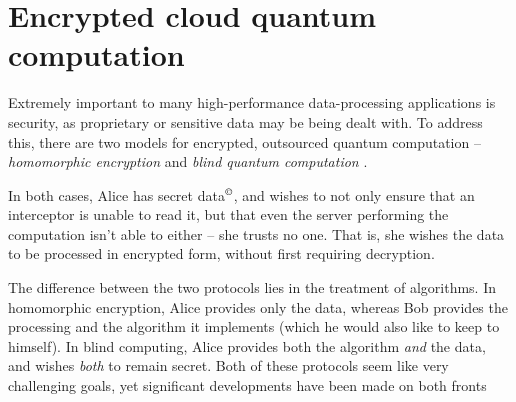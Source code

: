 %
%

\section{Encrypted cloud quantum computation} \label{sec:homo_blind} 


Extremely important to many high-performance data-processing applications is security, as proprietary or sensitive data may be being dealt with. To address this, there are two models for encrypted, outsourced quantum computation -- \textit{homomorphic encryption} \cite{???, gentry2009fully, van2010fully} and \textit{blind quantum computation} \cite{???, bib:blind2, bib:blind3, bib:blind1, PhysRevLett.108.200502, bib:Morimae3486, bib:Morimae5460, bib:Morimae3966}.

In both cases, Alice has secret data$^\copyright$, and wishes to not only ensure that an interceptor is unable to read it, but that even the server performing the computation isn't able to either -- she trusts no one. That is, she wishes the data to be processed in encrypted form, without first requiring decryption.

The difference between the two protocols lies in the treatment of algorithms. In homomorphic encryption, Alice provides only the data, whereas Bob provides the processing and the algorithm it implements (which  he would also like to keep to himself).  In blind computing, Alice provides both the algorithm \textit{and} the data, and wishes \textit{both} to remain secret. Both of these protocols seem like very challenging goals, yet significant developments have been made on both fronts 



